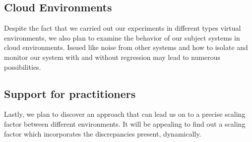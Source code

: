 \subsection{Cloud Environments}
Despite the fact that we carried out our experiments in different types virtual environments, we also plan to examine the behavior of our subject systems in cloud environments. Issued like noise from other systems and how to isolate and monitor our system with and without regression may lead to numerous possibilities.


\subsection{Support for practitioners}
Lastly, we plan to discover an approach that can lead us on to a precise scaling factor between different environments. It will be appealing to find out a scaling factor which incorporates the discrepancies present, dynamically.
